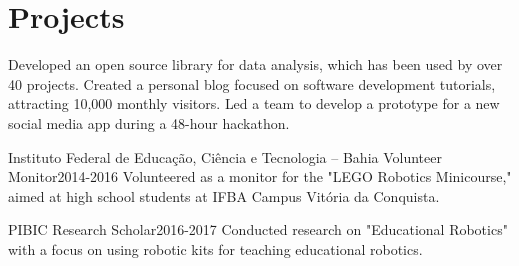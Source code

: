\section{Projects}
  \resumeSubHeadingListStart
      {Developed an open source library for data analysis, which has been used by over 40 projects.}
      {Created a personal blog focused on software development tutorials, attracting 10,000 monthly visitors.}
      {Led a team to develop a prototype for a new social media app during a 48-hour hackathon.}
  \resumeSubHeadingListEnd

  \resumeSubHeadingListStart

  \resumeSubheading
    {Instituto Federal de Educação, Ciência e Tecnologia – Bahia}{}
    {Volunteer Monitor}{2014-2016}
    \resumeItemListStart
        {Volunteered as a monitor for the "LEGO Robotics Minicourse," aimed at high school students at IFBA Campus Vitória da Conquista.}
    \resumeItemListEnd

  \resumeSubheading
    {PIBIC}{}
    {Research Scholar}{2016-2017}
    \resumeItemListStart
        {Conducted research on "Educational Robotics" with a focus on using robotic kits for teaching educational robotics.}
    \resumeItemListEnd

\resumeSubHeadingListEnd
